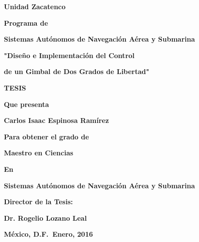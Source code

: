 \begin{minipage}{1\textwidth}
\vspace{0.2cm}
\centerline{\Large \bf Unidad Zacatenco}
\vspace{0.25cm}
\centerline{\bf Programa de}
\vspace{0.20cm}
\centerline{\large \bf Sistemas Aut\'onomos de Navegaci\'on A\'erea y Submarina}
\vspace{0.8cm}
\centerline{\Large \bf "Dise\~no e Implementaci\'on del Control }
\vspace{0.5cm}
\centerline{\Large \bf de un Gimbal de Dos Grados de Libertad"}
\vspace{0.8cm}
\centerline{\Large \bf TESIS}
\vspace{0.5cm}
\centerline{\bf Que presenta}
\vspace{0.4cm}
\centerline{\Large \bf Carlos Isaac Espinosa Ram\'irez}
\vspace{0.4cm}
\centerline{\bf Para obtener el grado de }
\vspace{0.4cm}
\centerline{\Large \bf Maestro en Ciencias}
\vspace{0.4cm}
\centerline{\bf En}
\vspace{0.4cm}
\centerline{\Large \bf Sistemas Aut\'onomos de Navegaci\'on A\'erea y Submarina}
\vspace{0.6cm}
\centerline{\bf Director de la Tesis:}
\vspace{0.20cm}
\centerline{\Large \bf Dr. Rogelio Lozano Leal}

\vspace{0.6cm}
{\large \bf M\'{e}xico, D.F.\ \hfill Enero, 2016}
\end{minipage}%

\newpage
\thispagestyle{empty}%
